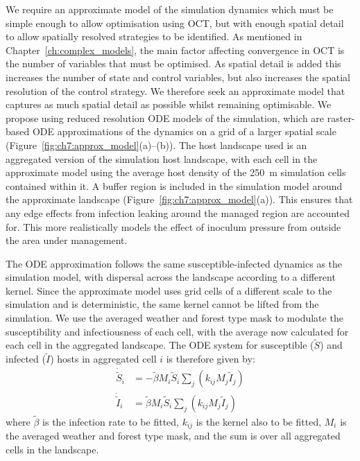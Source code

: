 We require an approximate model of the simulation dynamics which must be simple enough to allow optimisation using OCT, but with enough spatial detail to allow spatially resolved strategies to be identified. As mentioned in Chapter~\ref{ch:complex_models}, the main factor affecting convergence in OCT is the number of variables that must be optimised. As spatial detail is added this increases the number of state and control variables, but also increases the spatial resolution of the control strategy. We therefore seek an approximate model that captures as much spatial detail as possible whilst remaining optimisable. We propose using reduced resolution ODE models of the simulation, which are raster-based ODE approximations of the dynamics on a grid of a larger spatial scale (Figure~\ref{fig:ch7:approx_model}(a)--(b)). The host landscape used is an aggregated version of the simulation host landscape, with each cell in the approximate model using the average host density of the \SI{250}{\meter} simulation cells contained within it. A buffer region is included in the simulation model around the approximate landscape (Figure~\ref{fig:ch7:approx_model}(a)). This ensures that any edge effects from infection leaking around the managed region are accounted for. This more realistically models the effect of inoculum pressure from outside the area under management.

The ODE approximation follows the same susceptible-infected dynamics as the simulation model, with dispersal across the landscape according to a different kernel. Since the approximate model uses grid cells of a different scale to the simulation and is deterministic, the same kernel cannot be lifted from the simulation. We use the averaged weather and forest type mask to modulate the susceptibility and infectiousness of each cell, with the average now calculated for each cell in the aggregated landscape. The ODE system for susceptible ($\tilde{S}$) and infected ($\tilde{I}$) hosts in aggregated cell $i$ is therefore given by:
\begin{subequations}
    \label{eqn:ch7:approx_model}
    \begin{align}
        \dot{\tilde{S}}_i &= -\tilde{\beta}M_i\tilde{S}_i\sum_j\left(k_{ij}M_j\tilde{I}_j\right) \\
        \dot{\tilde{I}}_i &= \tilde{\beta}M_i\tilde{S}_i\sum_j\left(k_{ij}M_j\tilde{I}_j\right)
    \end{align}
\end{subequations}
where $\tilde{\beta}$ is the infection rate to be fitted, $k_{ij}$ is the kernel also to be fitted, $M_i$ is the averaged weather and forest type mask, and the sum is over all aggregated cells in the landscape.

